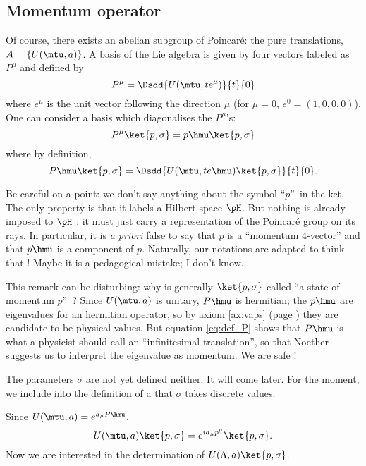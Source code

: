 \subsection{Momentum operator}

Of course, there exists an abelian subgroup of Poincaré: the pure translations, $A=\{U(\mtu,a)\}$. A basis of the Lie algebra is given by four vectors labeled as $P^{\mu}$ and defined by 
\[
P^{\mu}=\Dsdd{U(\mtu,te^{\mu})}{t}{0}
\]
 where $e^{\mu}$ is the unit vector following the direction $\mu$ (for $\mu=0$, $e^0=(1,0,0,0)$). One can consider a basis which diagonalises the $P^{\mu}$'s: 
\begin{equation}
  P^{\mu}\ket{p,\sigma}=p\hmu\ket{p,\sigma}
\end{equation}
where by definition,
\begin{equation}\label{eq:def_P}
   P\hmu\ket{p,\sigma}=\Dsdd{U(\mtu,te\hmu)\ket{p,\sigma}}{t}{0}.
\end{equation}

\begin{remark}
Be careful on a point: we don't say anything about the symbol ``$p$''\ in the ket. The only property is that it labels a Hilbert space $\pH$. But nothing is already imposed to $\pH$ : it must just carry a representation of the Poincaré group on its rays. In particular, it is \emph{a priori} false to say that $p$ is a ``momentum $4$-vector'' and that $p\hmu$ is a component of $p$. Naturally, our notations are adapted to think that ! Maybe it is a pedagogical mistake; I don't know. 
\end{remark}

This remark can be disturbing: why is generally $\ket{p,\sigma}$ called ``a state of momentum $p$''\ ? Since $U(\mtu,a)$ is unitary, $P\hmu$ is hermitian; the $p\hmu$ are eigenvalues for an hermitian operator, so by axiom \ref{ax:vaps} (page \pageref{pg:axiomes}) they are candidate to be physical values. But equation \eqref{eq:def_P} shows that $P\hmu$ is what a physicist should call an ``infinitesimal translation'', so that Noether suggests us to interpret the eigenvalue as momentum. We are safe !

The parameters $\sigma$ are not yet defined neither. It will come later. For the moment, we include into the definition of a  that $\sigma$ takes discrete values.
 
 Since $U(\mtu,a)=e^{a_{\mu} P\hmu}$,
\[
   U(\mtu,a)\ket{p,\sigma}=e^{ia_{\mu} p^{\mu}}\ket{p,\sigma}.
\]
Now we are interested in the determination of $U(\Lambda,a)\ket{p,\sigma}$.

